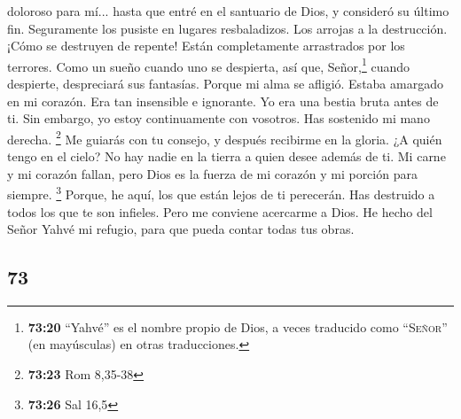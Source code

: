 \begin{paracol}{2}
doloroso para mí...  hasta que entré en el santuario de
Dios, y consideró su último fin.  Seguramente los pusiste
en lugares resbaladizos. Los arrojas a la destrucción. 
¡Cómo se destruyen de repente! Están completamente arrastrados por los
terrores.  Como un sueño cuando uno se despierta, así
que, Señor,\footnote{\textbf{73:20} ``Yahvé'' es el nombre propio de
  Dios, a veces traducido como ``\textsc{Señor}'' (en mayúsculas) en
  otras traducciones.} cuando despierte, despreciará sus fantasías.
 Porque mi alma se afligió. Estaba amargado en mi
corazón.  Era tan insensible e ignorante. Yo era una
bestia bruta antes de ti.  Sin embargo, yo estoy
continuamente con vosotros. Has sostenido mi mano derecha. \footnote{\textbf{73:23}
  Rom 8,35-38}  Me guiarás con tu consejo, y después
recibirme en la gloria.  ¿A quién tengo en el cielo? No
hay nadie en la tierra a quien desee además de ti.  Mi
carne y mi corazón fallan, pero Dios es la fuerza de mi corazón y mi
porción para siempre. \footnote{\textbf{73:26} Sal 16,5} 
Porque, he aquí, los que están lejos de ti perecerán. Has destruido a
todos los que te son infieles.  Pero me conviene
acercarme a Dios. He hecho del Señor Yahvé mi refugio, para que pueda
contar todas tus obras.

\switchcolumn
\begin{otherlanguage}{english}

\hypertarget{section-145}{%
\section{73}\label{section-145}}


\end{otherlanguage}
\end{paracol}
